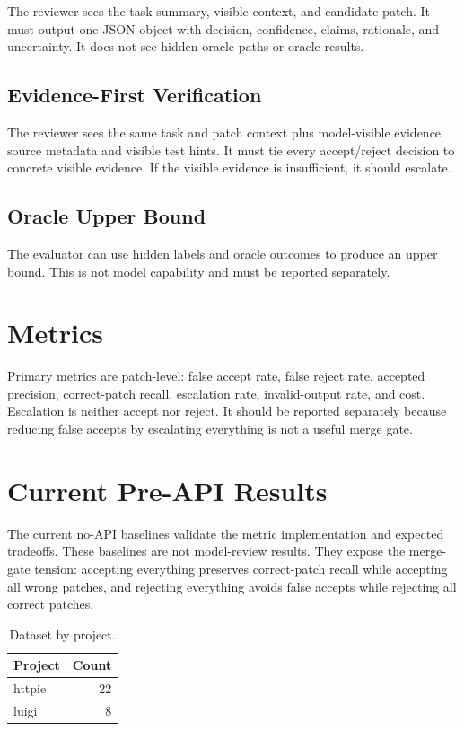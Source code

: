 \documentclass[conference]{IEEEtran}
\begin{document}
The reviewer sees the task summary, visible context, and candidate patch. It
must output one JSON object with decision, confidence, claims, rationale, and
uncertainty. It does not see hidden oracle paths or oracle results.

\subsection{Evidence-First Verification}

The reviewer sees the same task and patch context plus model-visible evidence
source metadata and visible test hints. It must tie every accept/reject
decision to concrete visible evidence. If the visible evidence is insufficient,
it should escalate.

\subsection{Oracle Upper Bound}

The evaluator can use hidden labels and oracle outcomes to produce an upper
bound. This is not model capability and must be reported separately.

\section{Metrics}

Primary metrics are patch-level: false accept rate, false reject rate, accepted
precision, correct-patch recall, escalation rate, invalid-output rate, and cost.
Escalation is neither accept nor reject. It should be reported separately
because reducing false accepts by escalating everything is not a useful merge
gate.

\section{Current Pre-API Results}

The current no-API baselines validate the metric implementation and expected
tradeoffs. These baselines are not model-review results. They expose the
merge-gate tension: accepting everything preserves correct-patch recall while
accepting all wrong patches, and rejecting everything avoids false accepts
while rejecting all correct patches.


\begin{table}[t]
\centering
\caption{Dataset by project.}
\label{tab:dataset-projects}
\begin{tabular}{lr}
\toprule
Project & Count \\
\midrule
httpie & 22 \\
luigi & 8 \\
\bottomrule
\end{tabular}
\end{table}
\end{document}
